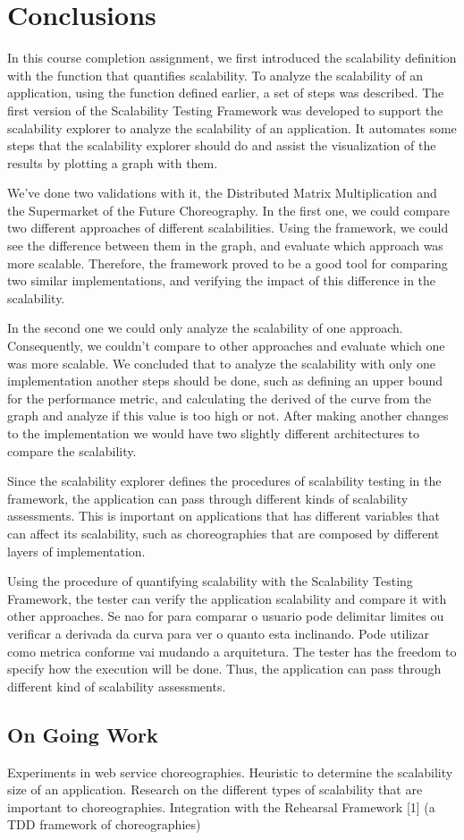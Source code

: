 \section{Conclusions}

In this course completion assignment, we first introduced the scalability definition with the function that quantifies scalability. To analyze the scalability of an application, using the function defined earlier, a set of steps was described. The first version of the Scalability Testing Framework was developed to support the scalability explorer to analyze the scalability of an application. It automates some steps that the scalability explorer should do and assist the visualization of the results by plotting a graph with them.

We've done two validations with it, the Distributed Matrix Multiplication and the Supermarket of the Future Choreography. In the first one, we could compare two different approaches of different scalabilities. Using the framework, we could see the difference between them in the graph, and evaluate which approach was more scalable. Therefore, the framework proved to be a good tool for comparing two similar implementations, and verifying the impact of this difference in the scalability.

In the second one we could only analyze the scalability of one approach. Consequently, we couldn't compare to other approaches and evaluate which one was more scalable. We concluded that to analyze the scalability with only one implementation another steps should be done, such as defining an upper bound for the performance metric, and calculating the derived of the curve from the graph and analyze if this value is too high or not. After making another changes to the implementation we would have two slightly different architectures to compare the scalability.

Since the scalability explorer defines the procedures of scalability testing in the framework, the application can pass through different kinds of scalability assessments. This is important on applications that has different variables that can affect its scalability, such as choreographies that are composed by different layers of implementation.



Using the procedure of quantifying scalability with the Scalability Testing Framework, the tester can verify the application scalability and compare it with other approaches. 
Se nao for para comparar o usuario pode delimitar limites ou verificar a derivada da curva para ver o quanto esta inclinando.
Pode utilizar como metrica conforme vai mudando a arquitetura.
The tester has the freedom to specify how the execution will be done. Thus, the application can pass through different kind of scalability assessments.

\subsection{On Going Work}
Experiments in web service choreographies. 
Heuristic to determine the scalability size of an application.
Research on the different types of scalability that are important to choreographies. 
Integration with the Rehearsal Framework [1] (a TDD framework of choreographies)